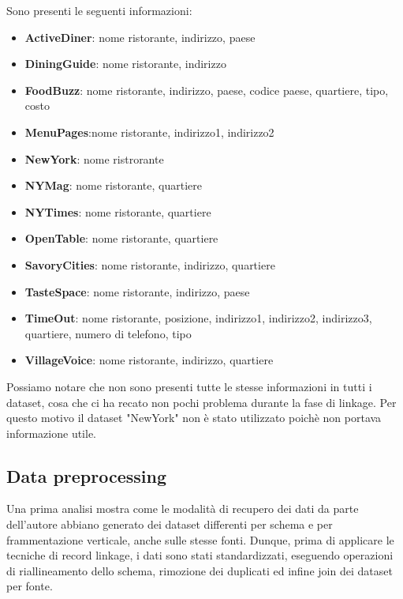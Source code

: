 \documentclass[a4paper,12pt]{article}
\begin{document}
\noindent Sono presenti le seguenti informazioni: 
\begin{itemize}
\item \textbf{ActiveDiner}: nome ristorante, indirizzo, paese
\item \textbf{DiningGuide}: nome ristorante, indirizzo
\item \textbf{FoodBuzz}: nome ristorante, indirizzo, paese, codice paese, quartiere, tipo, costo
\item \textbf{MenuPages}:nome ristorante, indirizzo1, indirizzo2
\item \textbf{NewYork}: nome ristrorante
\item \textbf{NYMag}: nome ristorante, quartiere
\item \textbf{NYTimes}: nome ristorante, quartiere
\item \textbf{OpenTable}: nome ristorante, quartiere
\item \textbf{SavoryCities}: nome ristorante, indirizzo, quartiere
\item \textbf{TasteSpace}: nome ristorante, indirizzo, paese
\item \textbf{TimeOut}: nome ristorante, posizione, indirizzo1, indirizzo2, indirizzo3, quartiere, numero di telefono, tipo
\item \textbf{VillageVoice}: nome ristorante, indirizzo, quartiere
\end{itemize}

\noindent Possiamo notare che non sono presenti tutte le stesse informazioni in tutti i dataset, cosa che ci ha recato non pochi problema durante la fase di linkage. Per questo motivo il dataset "NewYork" non è stato utilizzato poichè non portava informazione utile.

\subsection{Data preprocessing} 
Una prima analisi mostra come le modalità di recupero dei dati da parte dell'autore abbiano generato dei dataset differenti per schema e per frammentazione verticale, anche sulle stesse fonti. Dunque, prima di applicare le tecniche di record linkage, i dati sono stati standardizzati, eseguendo operazioni di riallineamento dello schema, rimozione dei duplicati ed infine join dei dataset per fonte.\\
\end{document}
